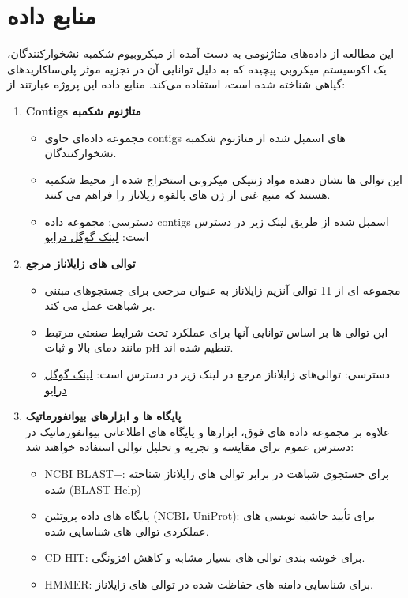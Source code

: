     \section{منابع داده}
        این مطالعه از داده‌های متاژنومی به دست آمده از میکروبیوم شکمبه نشخوارکنندگان، یک اکوسیستم میکروبی پیچیده که به دلیل توانایی آن در تجزیه موثر پلی‌ساکاریدهای گیاهی شناخته شده است، استفاده می‌کند. منابع داده این پروژه عبارتند از:
        \begin{enumerate}
            \item \textbf{Contigs متاژنوم شکمبه}
                \begin{itemize}
                    \item مجموعه داده‌ای حاوی contigs های اسمبل شده از متاژنوم شکمبه نشخوارکنندگان.
                    \item این توالی ها نشان دهنده مواد ژنتیکی میکروبی استخراج شده از محیط شکمبه هستند که منبع غنی از ژن های بالقوه زیلاناز را فراهم می کنند.
                    \item دسترسی: مجموعه داده contigs اسمبل شده از طریق لینک زیر در دسترس است:
                    \underline{\href{https://drive.google.com/file/d/14PGwsGuL2ouY-_fv0yrzijGnBMSjREU6/view}{لینک گوگل درایو}}
                \end{itemize}
            \item \textbf{توالی های زایلاناز مرجع}
                \begin{itemize}
                    \item مجموعه ای از 11 توالی آنزیم زایلاناز به عنوان مرجعی برای جستجوهای مبتنی بر شباهت عمل می کند.
                    \item این توالی ها بر اساس توانایی آنها برای عملکرد تحت شرایط صنعتی مرتبط مانند دمای بالا و ثبات pH تنظیم شده اند.
                    \item دسترسی: توالی‌های زایلاناز مرجع در لینک زیر در دسترس است:
                    \underline{\href{https://drive.google.com/file/d/1-dDyIdAXKUK97rxw_n4zE_gzh2fztFRU/view?usp=sharing}{لینک گوگل درایو}}
                \end{itemize}
            \item \textbf{پایگاه ها و ابزارهای بیوانفورماتیک}
                \\
                علاوه بر مجموعه داده های فوق، ابزارها و پایگاه های اطلاعاتی بیوانفورماتیک در دسترس عموم برای مقایسه و تجزیه و تحلیل توالی استفاده خواهند شد:
                \begin{itemize}
                    \item NCBI BLAST+: برای جستجوی شباهت در برابر توالی های زایلاناز شناخته شده 
                    (\href{https://blast.ncbi.nlm.nih.gov/doc/blast-help/downloadblastdata.html#downloadblastdata}{BLAST Help})
                    \item پایگاه های داده پروتئین (NCBI، UniProt): برای تأیید حاشیه نویسی های عملکردی توالی های شناسایی شده.
                    \item CD-HIT: برای خوشه بندی توالی های بسیار مشابه و کاهش افزونگی.
                    \item HMMER: برای شناسایی دامنه های حفاظت شده در توالی های زایلاناز.
                \end{itemize}
        \end{enumerate}

